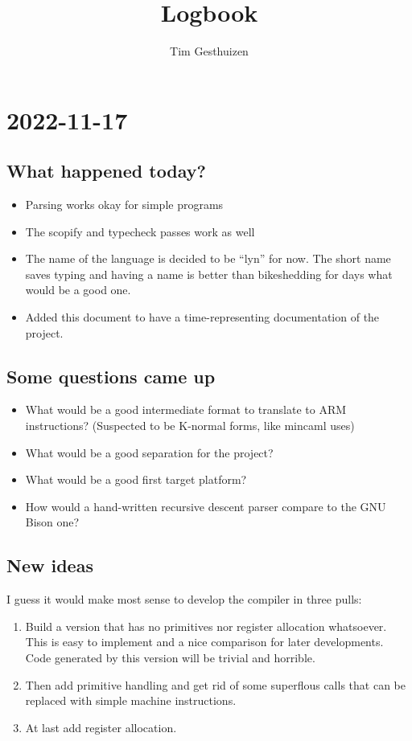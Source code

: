 \documentclass[12pt, article]{article}
\author{Tim Gesthuizen}
\title{Logbook}
\begin{document}
\maketitle

\section{2022-11-17}

\subsection{What happened today?}

\begin{itemize}
\item Parsing works okay for simple programs
\item The scopify and typecheck passes work as well
\item The name of the language is decided to be ``lyn'' for now.
  The short name saves typing and having a name is better than
  bikeshedding for days what would be a good one.
\item Added this document to have a time-representing documentation of
  the project.
\end{itemize}

\subsection{Some questions came up}

\begin{itemize}
\item What would be a good intermediate format to translate to ARM
  instructions? (Suspected to be K-normal forms, like mincaml uses)
\item What would be a good separation for the project?
\item What would be a good first target platform?
\item How would a hand-written recursive descent parser compare to the
  GNU Bison one?
\end{itemize}

\subsection{New ideas}

I guess it would make most sense to develop the compiler in three
pulls:
\begin{enumerate}
\item Build a version that has no primitives nor register allocation
  whatsoever.
  This is easy to implement and a nice comparison for later
  developments.
  Code generated by this version will be trivial and horrible.
\item Then add primitive handling and get rid of some superflous calls
  that can be replaced with simple machine instructions.
\item At last add register allocation.
\end{enumerate}
\end{document}
